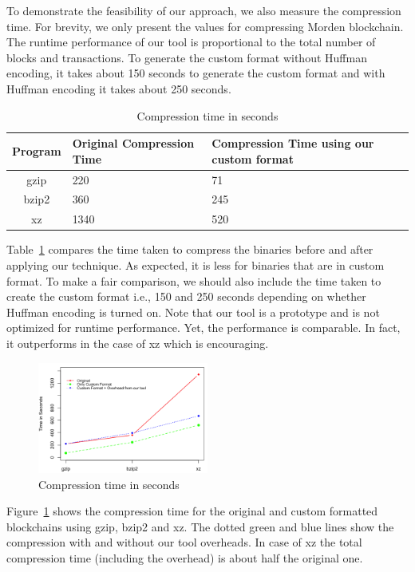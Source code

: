 To demonstrate the feasibility of our approach, we also measure the compression time. 
For brevity, we only 
present the values for compressing Morden blockchain.
The runtime performance of our tool is proportional to the total number of blocks and transactions. 
To generate the custom format without Huffman encoding, it takes about 150 seconds to generate the custom format and with Huffman encoding it takes about 250 seconds. 



\begin{table}[H]
	\centering
	\begin{tabular}{c | p{} | p{1.5cm}} 
	Program & {Original Compression Time} & {Compression Time using our custom format} \\
	\hline
	gzip & 220  & 71 \\
	bzip2 & 360  & 245\\
	xz & 1340 & 520 \\
	\end{tabular}
	\caption{Compression time in seconds}
	\label{tab:comptime}
\end{table}
Table~\ref{tab:comptime} compares the time taken to compress the binaries before and after applying our technique. As expected, it is less for binaries that are in custom format. 
To make a fair comparison, we should also include the time taken to create the custom format i.e., 150 and 250 seconds depending on whether Huffman encoding is turned on.
Note that our tool is a prototype and is not optimized for runtime performance. 
Yet, the performance is comparable. 
In fact, it outperforms in the case of xz which is encouraging.
\begin{figure}[H]
	\centering
	\includegraphics[width=0.5\textwidth, scale=0.5]{plots/time}
	\caption{Compression time in seconds}
	\label{fig:comptime}
\end{figure}
Figure~\ref{fig:comptime} shows the compression time for the original and custom formatted blockchains using gzip, bzip2 and xz.
The dotted green and blue lines show the compression with and without our tool
overheads. In case of xz the total compression time (including the overhead) is about half the original one.


